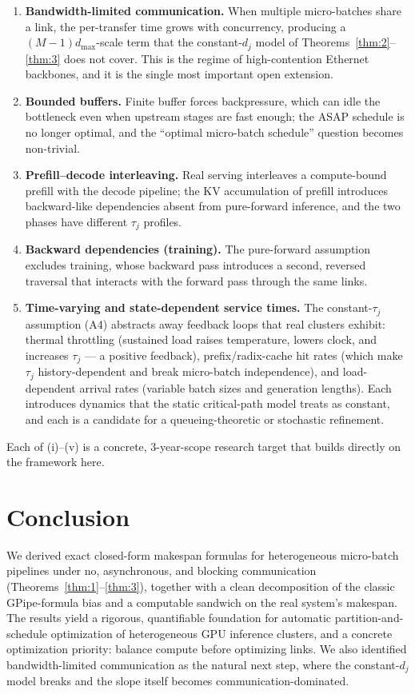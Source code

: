 \documentclass[11pt]{article}
\begin{document}
\begin{enumerate}
\item[(i)] \textbf{Bandwidth-limited communication.} When multiple micro-batches share a link, the per-transfer time grows with concurrency, producing a $(M-1)d_{\max}$-scale term that the constant-$d_j$ model of Theorems~\ref{thm:2}--\ref{thm:3} does not cover. This is the regime of high-contention Ethernet backbones, and it is the single most important open extension.
\item[(ii)] \textbf{Bounded buffers.} Finite buffer forces backpressure, which can idle the bottleneck even when upstream stages are fast enough; the ASAP schedule is no longer optimal, and the ``optimal micro-batch schedule'' question becomes non-trivial.
\item[(iii)] \textbf{Prefill--decode interleaving.} Real serving interleaves a compute-bound prefill with the decode pipeline; the KV accumulation of prefill introduces backward-like dependencies absent from pure-forward inference, and the two phases have different $\tau_j$ profiles.
\item[(iv)] \textbf{Backward dependencies (training).} The pure-forward assumption excludes training, whose backward pass introduces a second, reversed traversal that interacts with the forward pass through the same links.
\item[(v)] \textbf{Time-varying and state-dependent service times.} The constant-$\tau_j$ assumption (A4) abstracts away feedback loops that real clusters exhibit: thermal throttling (sustained load raises temperature, lowers clock, and increases $\tau_j$ --- a positive feedback), prefix/radix-cache hit rates (which make $\tau_j$ history-dependent and break micro-batch independence), and load-dependent arrival rates (variable batch sizes and generation lengths). Each introduces dynamics that the static critical-path model treats as constant, and each is a candidate for a queueing-theoretic or stochastic refinement.
\end{enumerate}

Each of (i)--(v) is a concrete, 3-year-scope research target that builds directly on the framework here.

\section{Conclusion}\label{sec:conclusion}

We derived exact closed-form makespan formulas for heterogeneous micro-batch pipelines under no, asynchronous, and blocking communication (Theorems~\ref{thm:1}--\ref{thm:3}), together with a clean decomposition of the classic GPipe-formula bias and a computable sandwich on the real system's makespan. The results yield a rigorous, quantifiable foundation for automatic partition-and-schedule optimization of heterogeneous GPU inference clusters, and a concrete optimization priority: balance compute before optimizing links. We also identified bandwidth-limited communication as the natural next step, where the constant-$d_j$ model breaks and the slope itself becomes communication-dominated.
\end{document}

